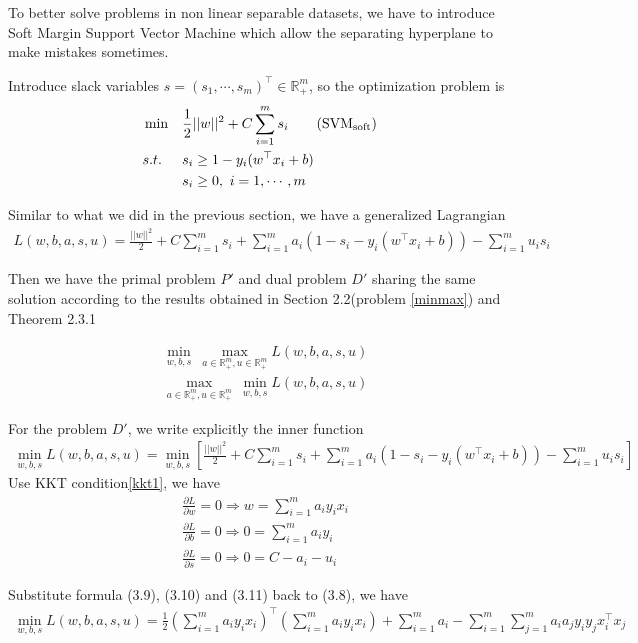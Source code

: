 \documentclass[a4paper]{report}
\begin{document}
To better solve problems in non linear separable datasets, we have to introduce Soft Margin Support Vector Machine which allow the separating hyperplane to make mistakes sometimes.

Introduce slack variables $s=(s_1,\cdots,s_m)^\top\in\mathbb R_+^m$, so the optimization problem is
\begin{align*}
    &\min & & \frac{1}{2} ||w||^2 + C\sum_{i=1}^m s_i \label{svmsoft}\tag{$\mathrm{SVM_{soft}}$} \\
    &s.t. & & s_i  \geq 1 - y_i(w^\top x_i +b)\\
    &     & & s_i \geq 0, \ i=1,\cdots,m
\end{align*}

Similar to what we did in the previous section, we have a generalized Lagrangian
\begin{align}
    L(w,b,a,s,u) = \frac{||w||^2}{2}+C\sum_{i=1}^m s_i + \sum_{i=1}^m a_i(1-s_i-y_i(w^\top x_i + b)) - \sum_{i=1}^m u_i s_i
\end{align}

Then we have the primal problem $P'$ and dual problem $D'$ sharing the same solution according to the results obtained in Section 2.2(problem \ref{minmax}) and Theorem 2.3.1

\begin{align}
    &\min_{w,b,s} \ \max_{a\in\mathbb R_+^m,u\in\mathbb R_+^m} L(w,b,a,s,u) \tag{P'}\\
    &\max_{a\in\mathbb R_+^m,u\in\mathbb R_+^m} \ \min_{w,b,s} L(w,b,a,s,u) \tag{D'}
\end{align}

For the problem $D'$, we write explicitly the inner function
\begin{align}
    \min_{w,b,s} L(w,b,a,s,u)=\min_{w,b,s}[\frac{||w||^2}{2}+C\sum_{i=1}^m s_i + \sum_{i=1}^m a_i(1-s_i-y_i(w^\top x_i + b)) - \sum_{i=1}^m u_i s_i]
\end{align}
Use KKT condition\ref{kkt1}, we have
\begin{align}
    &\frac{\partial L}{\partial w}=0\Rightarrow w=\sum_{i=1}^m a_i y_i x_i\\
    &\frac{\partial L}{\partial b}=0\Rightarrow 0=\sum_{i=1}^m a_i y_i \\
    &\frac{\partial L}{\partial s}=0\Rightarrow 0=C-a_i-u_i
\end{align}

Substitute formula (3.9), (3.10) and (3.11) back to (3.8), we have 
\begin{align}
    \min_{w,b,s} L(w,b,a,s,u) = \frac{1}{2}\left( \sum_{i=1}^m a_i y_i x_i \right)^\top \left( \sum_{i=1}^m a_i y_i x_i\right) + \sum_{i=1}^m a_i - \sum_{i=1}^m\sum_{j=1}^m a_i a_j y_i y_j x_i^\top x_j
\end{align}
\end{document}
